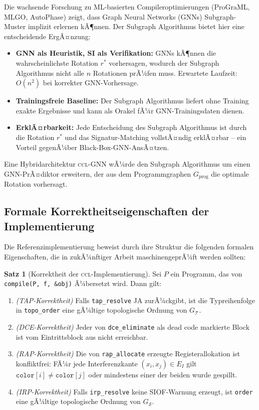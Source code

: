 ﻿\documentclass[a4paper,12pt]{article}
\theoremstyle{definition}
\newtheorem{satz}{Satz}
\begin{document}
Die wachsende Forschung zu ML-basierten Compileroptimierungen (ProGraML,
MLGO, AutoPhase) zeigt, dass Graph Neural Networks (GNNs) Subgraph-Muster
implizit erlernen kÃ¶nnen. Der Subgraph Algorithmus bietet hier eine
entscheidende ErgÃ¤nzung:

\begin{itemize}
	\item \textbf{GNN als Heuristik, SI als Verifikation:} GNNs
	kÃ¶nnen die wahrscheinlichste Rotation $r^*$ vorhersagen,
	wodurch der Subgraph Algorithmus nicht alle $n$ Rotationen
	prÃ¼fen muss. Erwartete Laufzeit: $O(n^2)$ bei korrekter
	GNN-Vorhersage.
	\item \textbf{Trainingsfreie Baseline:} Der Subgraph Algorithmus
	liefert ohne Training exakte Ergebnisse und kann als
	Orakel fÃ¼r GNN-Trainingsdaten dienen.
	\item \textbf{ErklÃ¤rbarkeit:} Jede Entscheidung des Subgraph
	Algorithmus ist durch die Rotation $r^*$ und das
	Signatur-Matching vollstÃ¤ndig erklÃ¤rbar -- ein Vorteil
	gegenÃ¼ber Black-Box-GNN-AnsÃ¤tzen.
\end{itemize}

Eine Hybridarchitektur \textsc{ccl-GNN} wÃ¼rde den Subgraph Algorithmus
um einen GNN-PrÃ¤diktor erweitern, der aus dem
Programmgraphen $G_{\mathrm{prog}}$ die optimale Rotation vorhersagt.

\subsection{Formale Korrektheitseigenschaften der Implementierung}
\label{sec:ausblick-formal}

Die Referenzimplementierung beweist durch ihre Struktur die folgenden
formalen Eigenschaften, die in zukÃ¼nftiger Arbeit maschinengeprÃ¼ft
werden sollten:

\begin{satz}[Korrektheit der \textsc{ccl}-Implementierung]
	\label{satz:ccl-correct}
	Sei $P$ ein Programm, das von \texttt{compile(P, f, \&obj)} Ã¼bersetzt
	wird. Dann gilt:
	\begin{enumerate}
		\item \emph{(TAP-Korrektheit)} Falls \texttt{tap\_resolve} JA
		zurÃ¼ckgibt, ist die Typreihenfolge in \texttt{topo\_order}
		eine gÃ¼ltige topologische Ordnung von $G_{\mathcal{T}}$.
		\item \emph{(DCE-Korrektheit)} Jeder von \texttt{dce\_eliminate}
		als dead code markierte Block ist vom Eintrittsblock aus nicht
		erreichbar.
		\item \emph{(RAP-Korrektheit)} Die von \texttt{rap\_allocate}
		erzeugte Registerallokation ist konfliktfrei: FÃ¼r jede
		Interferenzkante $(x_i, x_j) \in E_I$ gilt
		$\texttt{color}[i] \neq \texttt{color}[j]$ oder mindestens
		einer der beiden wurde gespillt.
		\item \emph{(IRP-Korrektheit)} Falls \texttt{irp\_resolve} keine
		SIOF-Warnung erzeugt, ist \texttt{order} eine gÃ¼ltige
		topologische Ordnung von $G_{\mathcal{S}}$.
	\end{enumerate}
\end{satz}
\end{document}
